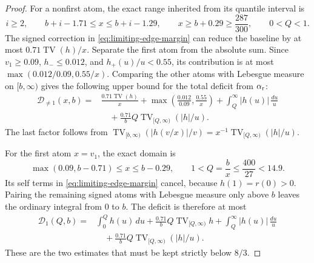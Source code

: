 \begin{proof}
For a nonfirst atom, the exact range inherited from its quantile interval is
\[
 i\ge2,\qquad
 b+i-1.71\le x\le b+i-1.29,\qquad
 x\ge b+0.29\ge\frac{287}{300},\qquad 0<Q<1.
\]
The signed correction in \eqref{eq:limiting-edge-margin} can reduce the baseline by at most \(0.71\operatorname{TV}(h)/x\). Separate the first atom from the absolute sum. Since \(v_1\ge0.09\), \(h_-\le0.012\), and \(h_+(u)/u<0.55\), its contribution is at most
\(\max(0.012/0.09,0.55/x)\). Comparing the other atoms with Lebesgue measure on \([b,\infty)\) gives the following upper bound for the total deficit from \(\alpha_{\rm r}\):
\begin{equation}\label{eq:nonfirst-edge-deficit}
 \begin{aligned}
 \mathcal D_{\ne1}(x,b)={}&
 \frac{0.71\operatorname{TV}(h)}x+
 \max\left(\frac{0.012}{0.09},\frac{0.55}x\right)
 +\int_Q^\infty |h(u)|\,\frac{du}{u}\\
 &\quad
 +\frac{0.71}{b}Q\operatorname{TV}_{[Q,\infty)}(|h|/u).
 \end{aligned}
\end{equation}
The last factor follows from
\(\operatorname{TV}_{[b,\infty)}(|h(v/x)|/v)
=x^{-1}\operatorname{TV}_{[Q,\infty)}(|h|/u)\).

For the first atom \(x=v_1\), the exact domain is
\[
 \max(0.09,b-0.71)\le x\le b-0.29,\qquad
 1<Q=\frac bx\le\frac{400}{27}<14.9.
\]
Its self terms in \eqref{eq:limiting-edge-margin} cancel, because
\(h(1)=r(0)>0\). Pairing the remaining signed atoms with Lebesgue measure only above \(b\) leaves the ordinary integral from \(0\) to \(b\). The deficit is therefore at most
\begin{equation}\label{eq:first-edge-deficit}
 \begin{aligned}
 \mathcal D_1(Q,b)={}&
 \int_0^Q h(u)\,du
 +\frac{0.71}{b}Q\operatorname{TV}_{[Q,\infty)}h
 +\int_Q^\infty |h(u)|\,\frac{du}{u}\\
 &\quad
 +\frac{0.71}{b}Q\operatorname{TV}_{[Q,\infty)}(|h|/u).
 \end{aligned}
\end{equation}
These are the two estimates that must be kept strictly below \(8/3\).


\end{proof}
